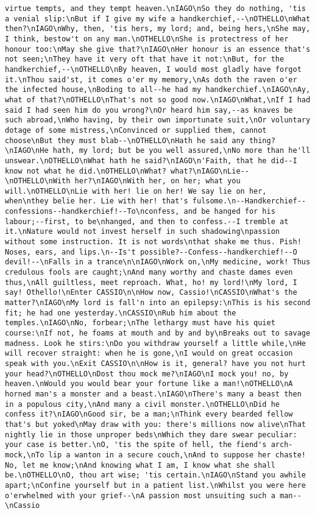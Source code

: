 \begin{verbatim}
virtue tempts, and they tempt heaven.\nIAGO\nSo they do nothing, 'tis a venial slip:\nBut if I give my wife a handkerchief,--\nOTHELLO\nWhat then?\nIAGO\nWhy, then, 'tis hers, my lord; and, being hers,\nShe may, I think, bestow't on any man.\nOTHELLO\nShe is protectress of her honour too:\nMay she give that?\nIAGO\nHer honour is an essence that's not seen;\nThey have it very oft that have it not:\nBut, for the handkerchief,--\nOTHELLO\nBy heaven, I would most gladly have forgot it.\nThou said'st, it comes o'er my memory,\nAs doth the raven o'er the infected house,\nBoding to all--he had my handkerchief.\nIAGO\nAy, what of that?\nOTHELLO\nThat's not so good now.\nIAGO\nWhat,\nIf I had said I had seen him do you wrong?\nOr heard him say,--as knaves be such abroad,\nWho having, by their own importunate suit,\nOr voluntary dotage of some mistress,\nConvinced or supplied them, cannot choose\nBut they must blab--\nOTHELLO\nHath he said any thing?\nIAGO\nHe hath, my lord; but be you well assured,\nNo more than he'll unswear.\nOTHELLO\nWhat hath he said?\nIAGO\n'Faith, that he did--I know not what he did.\nOTHELLO\nWhat? what?\nIAGO\nLie--\nOTHELLO\nWith her?\nIAGO\nWith her, on her; what you will.\nOTHELLO\nLie with her! lie on her! We say lie on her, when\nthey belie her. Lie with her! that's fulsome.\n--Handkerchief--confessions--handkerchief!--To\nconfess, and be hanged for his labour;--first, to be\nhanged, and then to confess.--I tremble at it.\nNature would not invest herself in such shadowing\npassion without some instruction. It is not words\nthat shake me thus. Pish! Noses, ears, and lips.\n--Is't possible?--Confess--handkerchief!--O devil!--\nFalls in a trance\n\nIAGO\nWork on,\nMy medicine, work! Thus credulous fools are caught;\nAnd many worthy and chaste dames even thus,\nAll guiltless, meet reproach. What, ho! my lord!\nMy lord, I say! Othello!\nEnter CASSIO\n\nHow now, Cassio!\nCASSIO\nWhat's the matter?\nIAGO\nMy lord is fall'n into an epilepsy:\nThis is his second fit; he had one yesterday.\nCASSIO\nRub him about the temples.\nIAGO\nNo, forbear;\nThe lethargy must have his quiet course:\nIf not, he foams at mouth and by and by\nBreaks out to savage madness. Look he stirs:\nDo you withdraw yourself a little while,\nHe will recover straight: when he is gone,\nI would on great occasion speak with you.\nExit CASSIO\n\nHow is it, general? have you not hurt your head?\nOTHELLO\nDost thou mock me?\nIAGO\nI mock you! no, by heaven.\nWould you would bear your fortune like a man!\nOTHELLO\nA horned man's a monster and a beast.\nIAGO\nThere's many a beast then in a populous city,\nAnd many a civil monster.\nOTHELLO\nDid he confess it?\nIAGO\nGood sir, be a man;\nThink every bearded fellow that's but yoked\nMay draw with you: there's millions now alive\nThat nightly lie in those unproper beds\nWhich they dare swear peculiar: your case is better.\nO, 'tis the spite of hell, the fiend's arch-mock,\nTo lip a wanton in a secure couch,\nAnd to suppose her chaste! No, let me know;\nAnd knowing what I am, I know what she shall be.\nOTHELLO\nO, thou art wise; 'tis certain.\nIAGO\nStand you awhile apart;\nConfine yourself but in a patient list.\nWhilst you were here o'erwhelmed with your grief--\nA passion most unsuiting such a man--\nCassio 
\end{verbatim}
